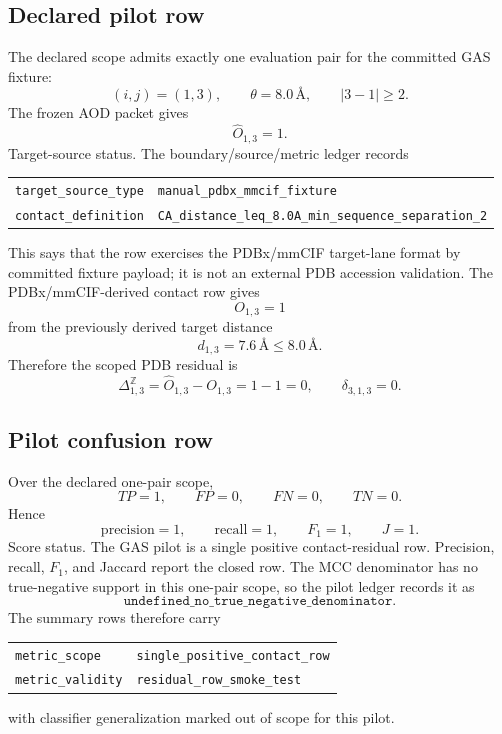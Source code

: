 \subsection{Declared pilot row}

The declared scope admits exactly one evaluation pair for the committed GAS fixture:
\[
(i,j)=(1,3),
\qquad
\theta=8.0\,\text{\AA},
\qquad
|3-1|\ge 2.
\]
The frozen AOD packet gives
\[
\widehat O_{1,3}=1.
\]
Target-source status. The boundary/source/metric ledger records
\begin{center}
\small
\begin{tabular}{ll}
\texttt{target\_source\_type} & \texttt{manual\_pdbx\_mmcif\_fixture}\\
\texttt{contact\_definition} & \texttt{CA\_distance\_leq\_8.0A\_min\_sequence\_separation\_2}
\end{tabular}
\end{center}
This says that the row exercises the PDBx/mmCIF target-lane format by committed fixture payload; it is not an external PDB accession validation. The PDBx/mmCIF-derived contact row gives
\[
O_{1,3}=1
\]
from the previously derived target distance
\[
d_{1,3}=7.6\,\text{\AA}\le 8.0\,\text{\AA}.
\]
Therefore the scoped PDB residual is
\[
\Delta^{\mathbb Z}_{1,3}=\widehat O_{1,3}-O_{1,3}=1-1=0,
\qquad
\delta_{3,1,3}=0.
\]

\subsection{Pilot confusion row}

Over the declared one-pair scope,
\[
TP=1,
\qquad
FP=0,
\qquad
FN=0,
\qquad
TN=0.
\]
Hence
\[
\mathrm{precision}=1,
\qquad
\mathrm{recall}=1,
\qquad
F_1=1,
\qquad
J=1.
\]
Score status. The GAS pilot is a single positive contact-residual row. Precision, recall, $F_1$, and Jaccard report the closed row. The MCC denominator has no true-negative support in this one-pair scope, so the pilot ledger records it as
\[
\texttt{undefined\_no\_true\_negative\_denominator}.
\]
The summary rows therefore carry
\begin{center}
\small
\begin{tabular}{ll}
\texttt{metric\_scope} & \texttt{single\_positive\_contact\_row}\\
\texttt{metric\_validity} & \texttt{residual\_row\_smoke\_test}
\end{tabular}
\end{center}
with classifier generalization marked out of scope for this pilot.


